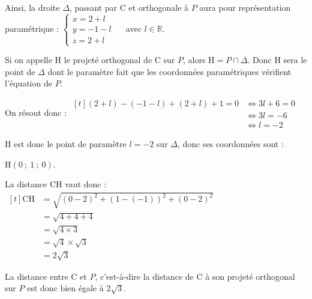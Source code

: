 \documentclass[10pt]{article}
\providecommand{\R}{\mathbb{R}}
\begin{document}
\begin{enumerate}
	Ainsi, la droite $\Delta$, passant par C et orthogonale à $P$ aura pour représentation paramétrique : \quad $\begin{cases} x = 2 + l\\y = -1 - l\\ z= 2 + l\end{cases}\quad$ avec $l\in\R$.

	Si on appelle H le projeté orthogonal de C sur $P$, alors $\mathrm{H} = P \cap \Delta$. Donc H sera le point de $\Delta$ dont le paramètre fait que les coordonnées paramétriques vérifient l'équation de $P$.

	On résout donc :  \quad $\begin{aligned}[t]
		(2 + l) - (-1 - l) + (2 + l) + 1 = 0 &\iff 3l + 6 = 0\\
		&\iff 3l = -6\\
		&\iff l = -2
	\end{aligned}$

	H est donc le point de paramètre $l = -2$ sur $\Delta$, donc ses coordonnées sont :

	$\mathrm{H} (0 ~;~ 1 ~;~ 0)$.

	La distance CH vaut donc : \quad $\begin{aligned}[t]
		\mathrm{CH} &= \sqrt{(0 - 2)^2 + (1 - (-1))^2 + (0 - 2)^2}\\
			&=\sqrt{4 + 4 + 4}\\
			&=\sqrt{4\times 3}\\
			&=\sqrt{4}\times \sqrt{3}\\
			&=2\sqrt{3}
	\end{aligned}$

	La distance entre C et $P$, c'est-à-dire la distance de C à son projeté orthogonal sur $P$ est donc bien égale à $2\sqrt{3}$.



\end{enumerate}
\medskip
\end{document}
